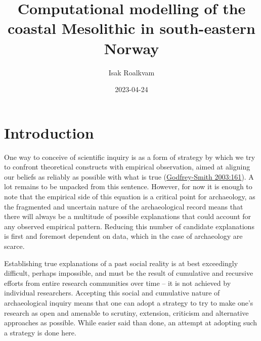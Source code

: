 \documentclass[
  a4paper,
  oneside]{uiophdthesis}
\title{Computational modelling of the coastal Mesolithic in south-eastern Norway}
\author{Isak Roalkvam}
\date{2023-04-24}
\begin{document}
\maketitle

{
\setcounter{tocdepth}{3}
\tableofcontents
}
\mainmatter

\hypertarget{introduction}{%
\section{Introduction}\label{introduction}}

One way to conceive of scientific inquiry is as a form of strategy by which we try to confront theoretical constructs with empirical observation, aimed at aligning our beliefs as reliably as possible with what is true (\protect\hyperlink{ref-godfrey-smith2003}{Godfrey-Smith 2003:161}). A lot remains to be unpacked from this sentence. However, for now it is enough to note that the empirical side of this equation is a critical point for archaeology, as the fragmented and uncertain nature of the archaeological record means that there will always be a multitude of possible explanations that could account for any observed empirical pattern. Reducing this number of candidate explanations is first and foremost dependent on data, which in the case of archaeology are scarce.

Establishing true explanations of a past social reality is at best exceedingly difficult, perhaps impossible, and must be the result of cumulative and recursive efforts from entire research communities over time -- it is not achieved by individual researchers. Accepting this social and cumulative nature of archaeological inquiry means that one can adopt a strategy to try to make one's research as open and amenable to scrutiny, extension, criticism and alternative approaches as possible. While easier said than done, an attempt at adopting such a strategy is done here.
\end{document}

